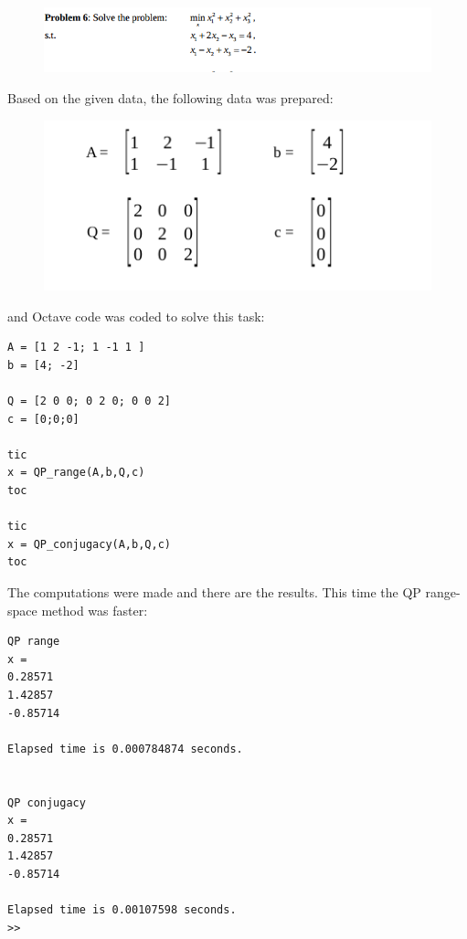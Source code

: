 \documentclass[eng,openany]{mgr}
\begin{document}
\begin{figure}[h]
\centering
\includegraphics[width=0.7\linewidth]{screenshot008}
\label{fig:screenshot008}
\end{figure}
Based on the given data, the following data was prepared:
\begin{figure}[h]
\centering
\includegraphics[width=0.55\linewidth]{screenshot010}
\label{fig:screenshot010}
\end{figure}

and Octave code was coded to solve this task:
\begin{lstlisting}
A = [1 2 -1; 1 -1 1 ]
b = [4; -2]

Q = [2 0 0; 0 2 0; 0 0 2]
c = [0;0;0]

tic
x = QP_range(A,b,Q,c)
toc

tic
x = QP_conjugacy(A,b,Q,c)
toc
\end{lstlisting}

The computations were made and there are the results. This time the QP range-space method was faster:
\begin{lstlisting}
QP range
x =
0.28571
1.42857
-0.85714

Elapsed time is 0.000784874 seconds.


QP conjugacy
x =
0.28571
1.42857
-0.85714

Elapsed time is 0.00107598 seconds.
>>
\end{lstlisting}
\clearpage
\end{document}
